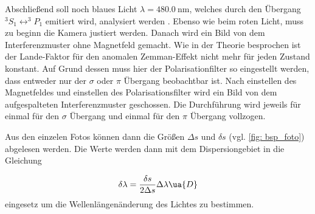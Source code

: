 Abschließend soll noch blaues Licht $\lambda=\SI{480.0}{\nm}$, welches durch den Übergang $^3S_1\leftrightarrow ^3\!\!P_1$ emitiert wird,
analysiert werden \cite{anleitung27}. Ebenso wie beim roten Licht, muss zu beginn die Kamera justiert werden.
Danach wird ein Bild von dem Interferenzmuster ohne Magnetfeld gemacht. Wie in der Theorie besprochen ist der
Lande-Faktor für den anomalen Zemman-Effekt nicht mehr für jeden Zustand konstant. Auf Grund dessen muss hier der Polarisationfilter
so eingestellt werden, dass entweder nur der $\sigma$ oder $\pi$ Übergang beobachtbar ist. Nach einstellen des Magnetfeldes
und einstellen des Polarisationsfilter wird ein Bild von dem aufgespalteten Interferenzmuster geschossen. Die Durchführung wird jeweils für
einmal für den $\sigma$ Übergang und einmal für den $\pi$ Übergang vollzogen.

Aus den einzelen Fotos können dann die Größen $\Delta s$ und $\delta s$ (vgl. \ref{fig: bsp_foto}) abgelesen werden.
Die Werte werden dann mit dem Dispersiongebiet in die Gleichung

\begin{equation}
  \label{eq: wellen_änderung}
  \delta \lambda=\frac{\delta s}{2\Delta s} \Delta \lambda\ua{D}
\end{equation}
eingesetz um die Wellenlängenänderung des Lichtes zu bestimmen.
